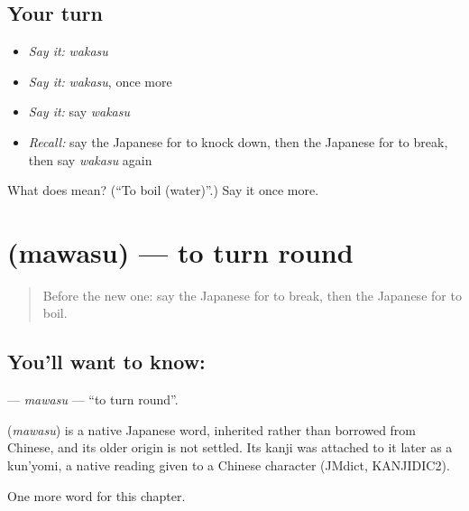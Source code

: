 \subsection*{Your turn}
\begin{itemize}
\raggedright
  \item \emph{Say it:} \emph{wakasu}
  \item \emph{Say it:} \emph{wakasu}, once more
  \item \emph{Say it:} say \emph{wakasu}
  \item \emph{Recall:} say the Japanese for to knock down, then the Japanese for to break, then say \emph{wakasu} again
\end{itemize}

\begin{tcolorbox}[breakable,colback=teal!4,colframe=teal!35!black,title={Before you move on}]
What does  mean? (\textquotedblleft{}To boil (water)\textquotedblright{}.) Say it once more.
\end{tcolorbox}
\section[\texorpdfstring{\ja{まわす} (mawasu)}{まわす (mawasu)}]{ (mawasu) — to turn round}

\label{lesson:JA-C89-mawasu}



\begin{quote}
Before the new one: say the Japanese for to break, then the Japanese for to boil.
\end{quote}

\subsection*{You'll want to know: }
\textbf{} — \emph{mawasu} — \textquotedblleft{}to turn round\textquotedblright{}.

\begin{cousinweb}
\textbf{} (\emph{mawasu}) is a native Japanese word, inherited rather than borrowed from Chinese, and its older origin is not settled. Its kanji was attached to it later as a kun'yomi, a native reading given to a Chinese character (JMdict, KANJIDIC2).
\end{cousinweb}

\begin{grammarlens}[title={What you've built}]
One more word for this chapter.
\end{grammarlens}


